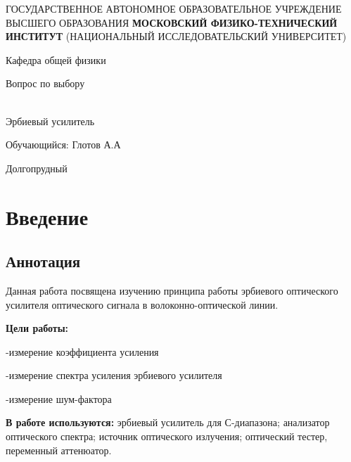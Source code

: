 \documentclass[12pt,a4paper]{article}
\author{Глотов Алексей}
\begin{document}
\newpage
\begin{center}
\footnotesize{{ГОСУДАРСТВЕННОЕ АВТОНОМНОЕ ОБРАЗОВАТЕЛЬНОЕ УЧРЕЖДЕНИЕ}\break
{ВЫСШЕГО ОБРАЗОВАНИЯ}
\break
{\bf {МОСКОВСКИЙ ФИЗИКО-ТЕХНИЧЕСКИЙ ИНСТИТУТ}}
\break
\small{(НАЦИОНАЛЬНЫЙ ИССЛЕДОВАТЕЛЬСКИЙ УНИВЕРСИТЕТ)}}
\break
\hfill \break
\hfill \break
\begin{center}
\large{Кафедра общей физики}
\end{center}
\hfill \break
\hfill \break
\hfill \break
\hfill \break

\begin{center}
\large{Вопрос по выбору}
\end{center}
\hfill \break\\
\LARGE{Эрбиевый усилитель}
\end{center}
\hfill \break
\hfill \break
\hfill \break
\hfill \break
\hfill \break
\hfill \break
\hfill \break
\hfill \break
\hfill \break
\hfill \break
\begin{flushright}
\large Обучающийся: Глотов А.А
\end{flushright}
\hfill \break
\hfill \break
\hfill \break
\hfill \break
\hfill \break
\hfill \break
\hfill \break
\hfill \break
\hfill \break
\hfill \break
\hfill \break
\hfill \break
\hfill \break
\begin{center}
Долгопрудный 
\end{center}
\thispagestyle{empty}
\newpage


\section{Введение}

\subsection{Аннотация}

Данная работа посвящена изучению принципа работы эрбиевого оптического усилителя оптического сигнала в волоконно-оптической линии.

\textbf{Цели работы:}

    -измерение коэффициента усиления

    -измерение спектра усиления эрбиевого усилителя

    -измерение шум-фактора 

\textbf{В работе используются:} эрбиевый усилитель для С-диапазона;
анализатор оптического спектра; источник оптического излучения;
оптический тестер, переменный аттенюатор.
\end{document}
